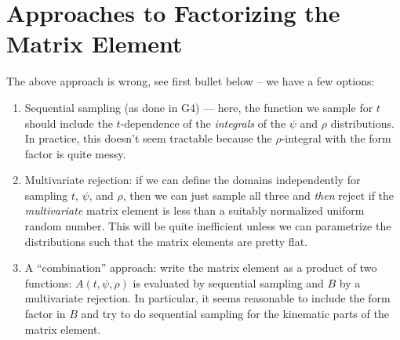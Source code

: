 \documentclass[11pt]{article}
\begin{document}

\section{Approaches to Factorizing the Matrix Element}
The above approach is wrong, see first bullet below -- we have a few options:
\begin{enumerate}
\item Sequential sampling (as done in G4) --- here, the function we sample for $t$ should include the $t$-dependence of the \emph{integrals} of the $\psi$ and $ \rho$ distributions.  In practice, this doesn't seem tractable because the $\rho$-integral with the form factor is quite messy. 
\item  Multivariate rejection: if we can define the domains independently for sampling $t$, $\psi$, and $\rho$, then we can just sample all three and \emph{then} reject if the \emph{multivariate} matrix element is less than a suitably normalized uniform random number.  This will be quite inefficient unless we can parametrize the distributions such  that the matrix elements are pretty flat.  
\item A ``combination'' approach: write the matrix element as a product of two functions: $A(t,\psi,\rho)$ is evaluated by sequential sampling and $B$ by a multivariate rejection. In particular, it seems reasonable to include the form factor in $B$ and try to do sequential sampling for the kinematic parts of the matrix element.
\end{enumerate}
 
\end{document}
